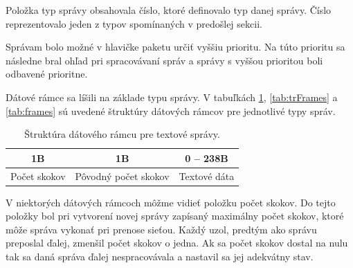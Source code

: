 \documentclass[slovak,master]{diploma}
\begin{document}
Položka typ správy obsahovala číslo, ktoré definovalo typ danej správy. Číslo reprezentovalo jeden z typov spomínaných v predošlej sekcii.

Správam bolo možné v hlavičke paketu určiť vyššiu prioritu. Na túto prioritu sa následne bral ohľad pri spracovávaní správ a správy s vyššou prioritou boli odbavené prioritne.

Dátové rámce sa líšili na základe typu správy. V tabuľkách \ref{tab:textFrame}, \ref{tab:trFrames} a \ref{tab:frames} 
sú uvedené štruktúry dátových rámcov pre jednotlivé typy správ.


\begin{table}[!h]
	\centering
  \caption{Štruktúra dátového rámcu pre textové správy.}
  \begin{tabular}{|c|c|c|}
    \toprule
    1B & 1B & 0 -- 238B \\
    \midrule
    Počet skokov & Pôvodný počet skokov & Textové dáta \\
    \midrule
  \end{tabular}
  \label{tab:textFrame}
\end{table}

\begin{table}[h!]
  \centering
  \qquad
  \caption{Štruktúra dátového rámcu pre správy typu traceroute.}
  \label{tab:trFrames}
\end{table}

V niektorých dátových rámcoch môžme vidieť položku počet skokov. Do tejto položky bol pri vytvorení novej správy zapísaný maximálny počet skokov, ktoré môže správa vykonať 
pri prenose sieťou. Každý uzol, predtým ako správu preposlal ďalej, zmenšil počet skokov o jedna. Ak sa počet skokov dostal na nulu tak sa daná správa ďalej nespracovávala a nastavil sa jej 
adekvátny stav.
\end{document}
